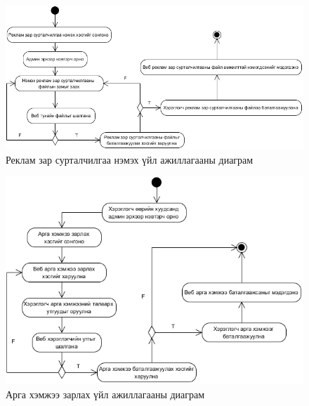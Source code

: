 \begin{figure}
	\centering
	\includegraphics[scale=0.6]{Diagrams/add}
	\caption[Реклам зар сурталчилгаа нэмэх үйл ажиллагааны диаграм]{Реклам зар сурталчилгаа нэмэх үйл ажиллагааны диаграм}
	\label{text}
\end{figure}
\begin{figure}
	\centering
	\includegraphics[scale=0.75]{Diagrams/event}
	\caption[Арга хэмжээ зарлах үйл ажиллагааны диаграм]{Арга хэмжээ зарлах үйл ажиллагааны диаграм}
	\label{text}
\end{figure}
